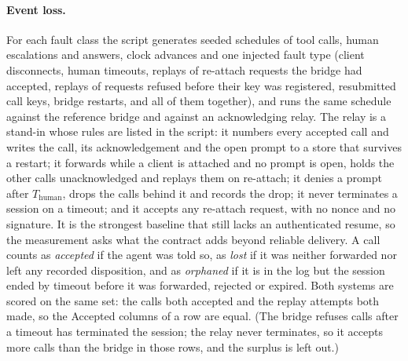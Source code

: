\paragraph{Event loss.} For each fault class the script generates
seeded schedules of tool calls, human escalations and answers, clock
advances and one injected fault type (client disconnects, human
timeouts, replays of re-attach requests the bridge had accepted, replays of requests refused before their key was registered, resubmitted call keys, bridge
restarts, and all of them together), and runs the same schedule against
the reference bridge and against an acknowledging relay. The relay is a
stand-in whose rules are listed in the script: it numbers every accepted
call and writes the call, its acknowledgement and the open prompt to a
store that survives a restart; it forwards while a client is attached and
no prompt is open, holds the other calls unacknowledged and replays them
on re-attach; it denies a prompt after $T_{\text{human}}$, drops the calls
behind it and records the drop; it never terminates a session on a
timeout; and it accepts any re-attach request, with no nonce and no
signature. It is the strongest baseline that still lacks an authenticated
resume, so the measurement asks what the contract adds beyond reliable
delivery. A call counts as \emph{accepted} if the agent was told so, as
\emph{lost} if it was neither forwarded nor left any recorded
disposition, and as \emph{orphaned} if it is in the log but the session
ended by timeout before it was forwarded, rejected or expired. Both
systems are scored on the same set: the calls both accepted and the replay
attempts both made, so the Accepted columns of a row are equal. (The
bridge refuses calls after a timeout has terminated the session; the relay
never terminates, so it accepts more calls than the bridge in those rows,
and the surplus is left out.)



